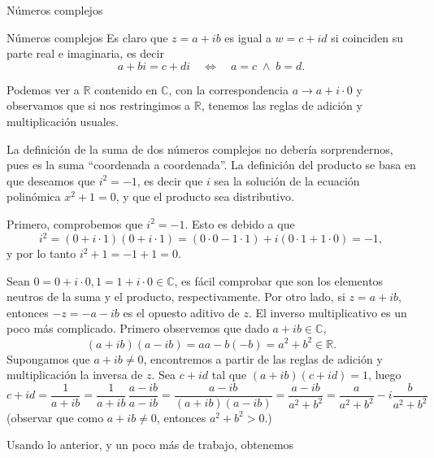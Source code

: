 \documentclass[a4paper,12pt,twoside,spanish,reqno]{amsbook}
\numberwithin{equation}{section}
\theoremstyle{definition}
\theoremstyle{remark}
\newcommand{\R}{\mathbb R}
\newcommand{\C}{\mathbb C}
\begin{document}
\begin{chapter}{Números complejos}
\begin{section}{Números complejos}
        Es claro  que $z=a+ib$ es igual a $w = c+id$ si coinciden su parte real e imaginaria, es decir
        \begin{equation*}
        a+ bi = c+ di\quad \Leftrightarrow\quad a=c \;\wedge\; b = d.
        \end{equation*}
        
        Podemos  ver a $\R$ contenido en $\C$,  con la correspondencia $a \to a + i \cdot 0$ y  observamos que si  nos restringimos a $\R$, tenemos las reglas de adición y  multiplicación usuales.  
        
        La definición de la suma de dos números complejos no debería sorprendernos, pues es la suma ``coordenada a coordenada''. La definición del producto se basa en que deseamos que $i^2 = -1$,  es decir que $i$  sea la solución de la ecuación polinómica $x^2 + 1 =0$,   y que el producto sea distributivo. 	
        
        Primero, comprobemos que  $i^2 = -1$. Esto es debido a que
        \begin{equation*}
        i^2 = (0 + i\cdot 1)(0 + i\cdot 1) = (0\cdot 0 - 1 \cdot 1) + i(0\cdot 1 + 1 \cdot 0) = -1,
        \end{equation*} 
        y por lo tanto $i^2 + 1 = -1+1 = 0$.  
        
        
        Sean $0 = 0 + i\cdot 0, 1 = 1 + i\cdot 0 \in \C$,  es fácil comprobar que son los elementos neutros de la suma y el producto,  respectivamente. Por otro lado, si $z = a + ib$,  entonces $-z = -a -ib$ es el opuesto aditivo de $z$. 
        El inverso multiplicativo es un poco más complicado. Primero observemos que dado $a+ib \in \C$,
        \begin{equation*}
        (a+ ib)(a-ib) = aa -b(-b) = a^2 + b^2 \in \R. 
        \end{equation*}
        Supongamos que $a+ib\ne0$,  encontremos  a partir  de las reglas de adición y multiplicación la inversa de $z$. Sea $c+id$ tal que $(a+ib)(c+id)=1$, luego
        \begin{equation*}
        c + id = \frac{1}{a+ib} = \frac{1}{a+ib}\,\frac{a-ib}{a-ib} = \frac{a-ib}{(a+ib)(a-ib)} = 
        \frac{a-ib}{ a^2 + b^2} = \frac{a}{ a^2 + b^2} - i\frac{b}{ a^2 + b^2}
        \end{equation*}  
        (observar que como $a+ib\ne0$,  entonces $a^2 + b^2 >0$.)
        
        Usando lo anterior,  y un poco más de trabajo, obtenemos
        

\end{section}
\end{chapter}
\end{document}
